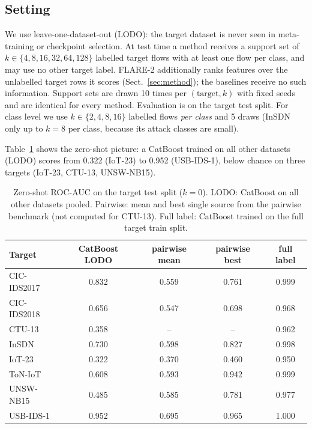 \documentclass[pdflatex,sn-mathphys-num]{sn-jnl}%
\begin{document}
\subsection{Setting}
We use leave-one-dataset-out (LODO): the target dataset is never seen in meta-training or checkpoint selection.
At test time a method receives a support set of $k\in\{4,8,16,32,64,128\}$ labelled target flows with at least one flow per class, and may use no other target label. FLARE-2 additionally ranks features over the unlabelled target rows it scores (Sect.~\ref{sec:method}); the baselines receive no such information.
Support sets are drawn 10 times per $(\text{target},k)$ with fixed seeds and are identical for every method.
Evaluation is on the target test split.
For class level we use $k\in\{2,4,8,16\}$ labelled flows \emph{per class} and 5 draws (InSDN only up to $k=8$ per class, because its attack classes are small).


Table~\ref{tab:zero} shows the zero-shot picture: a CatBoost trained on all other datasets (LODO) scores from 0.322 (IoT-23) to 0.952 (USB-IDS-1), below chance on three targets (IoT-23, CTU-13, UNSW-NB15).

\begin{table}[htbp]
\centering\small
\caption{Zero-shot ROC-AUC on the target test split ($k=0$). LODO: CatBoost on all other datasets pooled. Pairwise: mean and best single source from the pairwise benchmark (not computed for CTU-13). Full label: CatBoost trained on the full target train split.}\label{tab:zero}
{\scriptsize\setlength{\tabcolsep}{2.5pt}\begin{tabular}{lcccc}
\toprule
Target & CatBoost LODO & pairwise mean & pairwise best & full label \\
\midrule
CIC-IDS2017 & 0.832 & 0.559 & 0.761 & 0.999 \\
CIC-IDS2018 & 0.656 & 0.547 & 0.698 & 0.968 \\
CTU-13 & 0.358 & -- & -- & 0.962 \\
InSDN & 0.730 & 0.598 & 0.827 & 0.998 \\
IoT-23 & 0.322 & 0.370 & 0.460 & 0.950 \\
ToN-IoT & 0.608 & 0.593 & 0.942 & 0.999 \\
UNSW-NB15 & 0.485 & 0.585 & 0.781 & 0.977 \\
USB-IDS-1 & 0.952 & 0.695 & 0.965 & 1.000 \\
\bottomrule
\end{tabular}}
\end{table}
\end{document}
